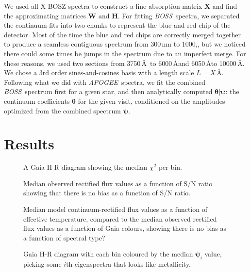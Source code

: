 \documentclass[modern]{aastex631}
\newcommand{\project}[1]{\textit{#1}}
\newcommand{\vectheta}{\boldsymbol{\theta}}
\newcommand{\vecpsi}{\boldsymbol{\psi}}
\newcommand{\vecW}{\mathbf{W}}
\newcommand{\vecH}{\mathbf{H}}
\newcommand{\vecX}{\mathbf{X}}
\newcommand{\apogee}{\project{APOGEE}}
\newcommand{\boss}{\project{BOSS}}
\newcommand{\todo}[1]{\textcolor{tab:blue}{#1}}
\begin{document}
We used all \todo{X} BOSZ spectra to construct a line absorption matrix $\vecX$ and find the approximating matrices $\vecW$ and $\vecH$. For fitting \boss\ spectra, we separated the continuum fits into two chunks to represent the blue and red chip of the detector. Most of the time the blue and red chips are correctly merged together to produce a seamless contiguous spectrum from \todo{300\,nm to 1000,\nm}, but we noticed there could some times be jumps in the spectrum due to an imperfect merge. For these reasons, we used two sections from \todo{3750\,\AA\ to 6000\,\AA and 6050\,\AA to 10000\,\AA}. We chose a \todo{3rd} order sines-and-cosines basis with a length scale $L = X$\,\AA. Following what we did with \apogee\ spectra, we fit the combined \boss\ spectrum first for a given star, and then analytically computed $\vectheta{}|\vecpsi$: the continuum coefficients $\vectheta$ for the given visit, conditioned on the amplitudes optimized from the combined spectrum $\vecpsi$.

\section{Results}\label{sec:results}

\begin{figure}
    \caption{A Gaia H-R diagram showing the median $\chi^2$ per bin.}
\end{figure}

\begin{figure}
    \caption{Median observed rectified flux values as a function of S/N ratio showing that there is no bias as a function of S/N ratio.}
\end{figure}


\begin{figure}
    \caption{Median model continuum-rectified flux values as a function of effective temperature, compared to the median observed rectified flux values as a function of Gaia colours, showing there is no bias as a function of spectral type?}
\end{figure}


\begin{figure}
    \caption{Gaia H-R diagram with each bin coloured by the median $\vecpsi_i$ value, picking some $i$th eigenspectra that looks like metallicity. \label{fig:gaia_hrd_metallicity}}
\end{figure}


\begin{figure*}
    \caption{The median pixel $\chi^2$ value as a function of \emph{Gaia} $\mathrm{BP} - \mathrm{RP}$ color for main-sequence stars observed with the BOSS spectrograph. \todo{Should expect to see increasing residuals due to TiO bands not captured by the model, and emission lines.}}
\end{figure*}
\end{document}
